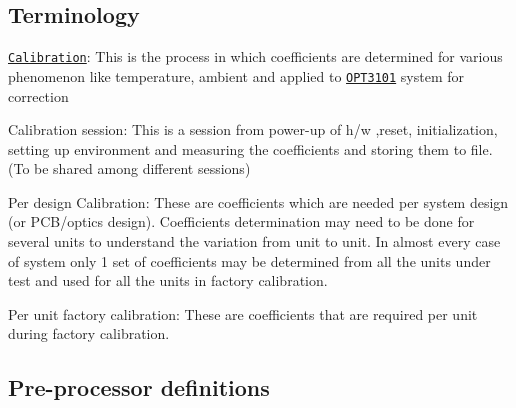 \subsection*{Terminology}


\begin{DoxyItemize}
\item \href{http://www.ti.com/lit/ug/sbau310/sbau310.pdf}{\tt Calibration}\+: This is the process in which coefficients are determined for various phenomenon like temperature, ambient and applied to \href{http://www.ti.com/product/OPT3101}{\tt O\+P\+T3101} system for correction
\item Calibration session\+: This is a session from power-\/up of h/w ,reset, initialization, setting up environment and measuring the coefficients and storing them to file. (To be shared among different sessions)
\item Per design Calibration\+: These are coefficients which are needed per system design (or P\+C\+B/optics design). Coefficients determination may need to be done for several units to understand the variation from unit to unit. In almost every case of system only 1 set of coefficients may be determined from all the units under test and used for all the units in factory calibration.
\item Per unit factory calibration\+: These are coefficients that are required per unit during factory calibration.
\end{DoxyItemize}





\subsection*{Pre-\/processor definitions}

